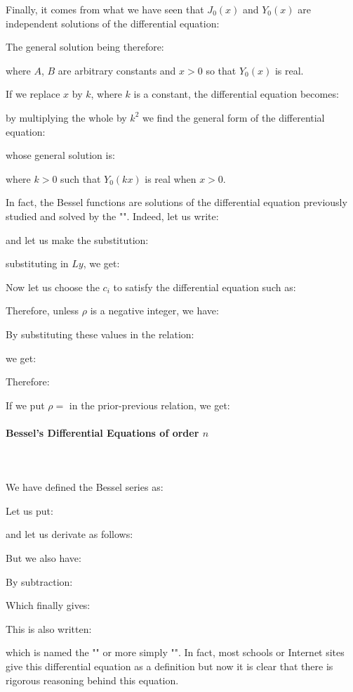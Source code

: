 	Finally, it comes from what we have seen that $J_0(x)$ and $Y_0(x)$ are independent solutions of the differential equation:
	
	The general solution being therefore:
	
	where $A$, $B$ are arbitrary constants and $x>0$ so that $Y_0(x)$ is real.

	If we replace $x$ by $k$, where $k$ is a constant, the differential equation becomes:
	
	by multiplying the whole by $k^2$ we find the general form of the differential equation:
	
	whose general solution is:
	
	where $k>0$ such that $Y_0(kx)$ is real when $x>0$.
	
	In fact, the Bessel functions are solutions of the differential equation previously studied and solved by the "\label{Frobenius method}". Indeed, let us write:
	
	and let us make the substitution:
	
	substituting in $Ly$, we get:
	
	Now let us choose the $c_i$ to satisfy the differential equation such as:
	
	Therefore, unless $\rho$ is a negative integer, we have:
	
	By substituting these values in the relation:
	
	we get:
	
	Therefore:
	
	If we put $\rho=$ in the prior-previous relation, we get:
	
	
	\paragraph{Bessel's Differential Equations of order $n$}\mbox{}\\\\
	We have defined the Bessel series as:
	
	Let us put:
	
	and let us derivate as follows:
	
	But we also have:
	
	By subtraction:
	
	Which finally gives:
	
	This is also written:
	
	which is named the "" or more simply "". In fact, most schools or Internet sites give this differential equation as a definition but now it is clear that there is rigorous reasoning behind this equation.
	
